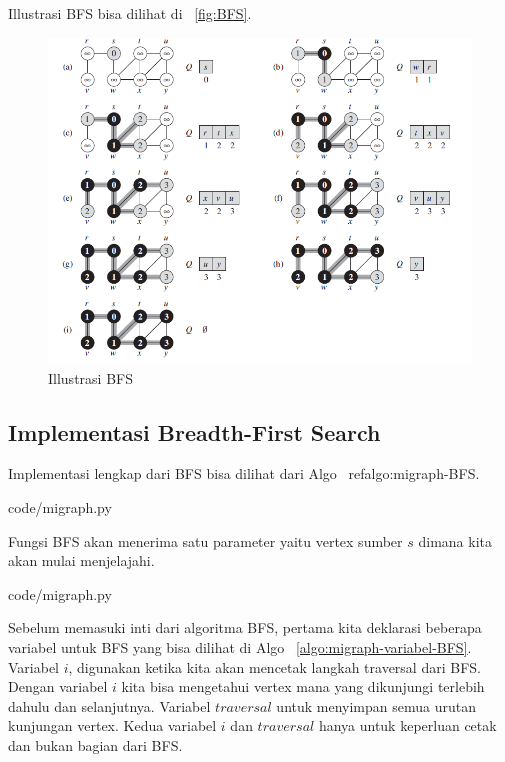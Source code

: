 Illustrasi BFS bisa dilihat di ~\ref{fig:BFS}.

\begin{figure}
    \includegraphics[width=\textwidth,keepaspectratio]{fig/BFS.png}%
	\caption{Illustrasi BFS}%
	\label{fig:bfs}%
\end{figure}

\subsection{Implementasi Breadth-First Search}

Implementasi lengkap dari BFS bisa dilihat dari Algo ~ref{algo:migraph-BFS}.


                {code/migraph.py}

Fungsi BFS akan menerima satu parameter yaitu vertex sumber $s$ dimana kita akan mulai menjelajahi.


                {code/migraph.py}

Sebelum memasuki inti dari algoritma BFS, pertama kita deklarasi beberapa variabel untuk BFS yang bisa dilihat di Algo ~\ref{algo:migraph-variabel-BFS}. Variabel $i$, digunakan ketika kita akan mencetak langkah traversal dari BFS. Dengan variabel $i$ kita bisa mengetahui vertex mana yang dikunjungi terlebih dahulu dan selanjutnya. Variabel $traversal$ untuk menyimpan semua urutan kunjungan vertex. Kedua variabel $i$ dan $traversal$ hanya untuk keperluan cetak dan bukan bagian dari BFS. 

